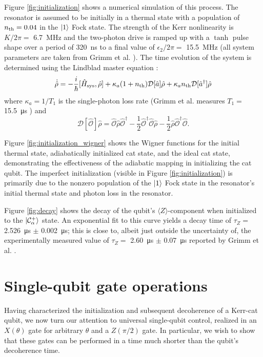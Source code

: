 Figure \ref{fig:initialization} shows a numerical simulation of this process.
The resonator is assumed to be initially in a thermal state with a population of $n_{\rm th} = 0.04$ in the $\ket{1}$ Fock state.
The strength of the Kerr nonlinearity is $K / 2\pi =$ \SI{6.7}{\MHz} and the two-photon drive is ramped up with a $\tanh$ pulse shape over a period of \SI{320}{\ns} to a final value of $\epsilon_2 / 2 \pi =$ \SI{15.5}{\MHz} (all system parameters are taken from Grimm et al. \cite{grimm_2020}).
The time evolution of the system is determined using the Lindblad master equation \cite{manzano_2020}:
\[
    \dot{\hat{\rho}} = - \frac {i} {\hbar} [\hat{H}_{\rm sys}, \hat{\rho}] + \kappa_a (1 + n_{\rm th}) \mathcal{D}[\hat{a}] \hat{\rho} + \kappa_a n_{\rm th} \mathcal{D}[\hat{a}^\dag] \hat{\rho}
\]
where $\kappa_a = 1/T_1$ is the single-photon loss rate (Grimm et al. measures $T_1 =$ \SI{15.5}{\micro\s} \cite{grimm_2020}) and
\[
    \mathcal{D}[\hat{\mathcal{O}}] \hat{\rho} = \hat{\mathcal{O}} \hat{\rho} \hat{\mathcal{O}}^\dag - \frac {1} {2} \hat{\mathcal{O}}^\dag \hat{\mathcal{O}} \hat{\rho} - \frac {1} {2} \hat{\rho} \hat{\mathcal{O}}^\dag \hat{\mathcal{O}}.
\]

Figure \ref{fig:initialization_wigner} shows the Wigner functions for the initial thermal state, adiabatically initialized cat state, and the ideal cat state, demonstrating the effectiveness of the adiabatic mapping in initializing the cat qubit.
The imperfect initialization (visible in Figure \ref{fig:initialization}) is primarily due to the nonzero population of the $\ket{1}$ Fock state in the resonator's initial thermal state and photon loss in the resonator.

Figure \ref{fig:decay} shows the decay of the qubit's $\langle Z \rangle$-component when initialized to the $\ket{\mathcal{C}_\alpha^+}$ state.
An exponential fit to this curve yields a decay time of $\tau_Z =$ \SI{2.526}{\micro\s} $\pm$ \SI{0.002}{\micro\s}; this is close to, albeit just outside the uncertainty of, the experimentally measured value of $\tau_Z =$ \SI{2.60}{\micro\s} $\pm$ \SI{0.07}{\micro\s} reported by Grimm et al. \cite{grimm_2020}.

\section{\label{sec:gates} Single-qubit gate operations}

Having characterized the initialization and subsequent decoherence of a Kerr-cat qubit, we now turn our attention to universal single-qubit control, realized in an $X(\theta)$ gate for arbitrary $\theta$ and a $Z(\pi/2)$ gate.
In particular, we wish to show that these gates can be performed in a time much shorter than the qubit's decoherence time.

